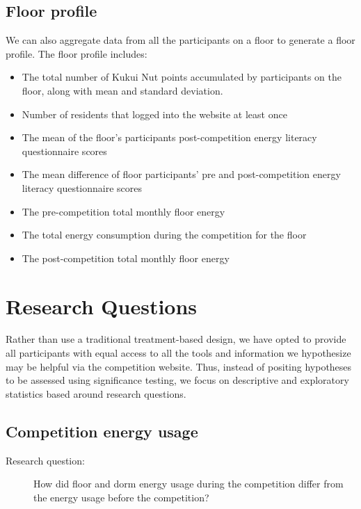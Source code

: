 \subsection{Floor profile}

We can also aggregate data from all the participants on a floor to generate a floor profile. The floor profile includes:

\begin{itemize}
\item The total number of Kukui Nut points accumulated by participants on the floor, along with mean and standard deviation.
\item Number of residents that logged into the website at least once
\item The mean of the floor's participants post-competition energy literacy questionnaire scores
\item The mean difference of floor participants' pre and post-competition energy literacy questionnaire scores
\item The pre-competition total monthly floor energy
\item The total energy consumption during the competition for the floor
\item The post-competition total monthly floor energy
\end{itemize}

\section{Research Questions}

Rather than use a traditional treatment-based design, we have opted to provide all participants with equal access to all the tools and information we hypothesize may be helpful via the competition website. Thus, instead of positing hypotheses to be assessed using significance testing, we focus on descriptive and exploratory statistics based around research questions.

\subsection{Competition energy usage}
\label{sec:competition-energy}

\begin{description}
\item[Research question:] How did floor and dorm energy usage during the competition differ from the energy usage before the competition?
\end{description}

